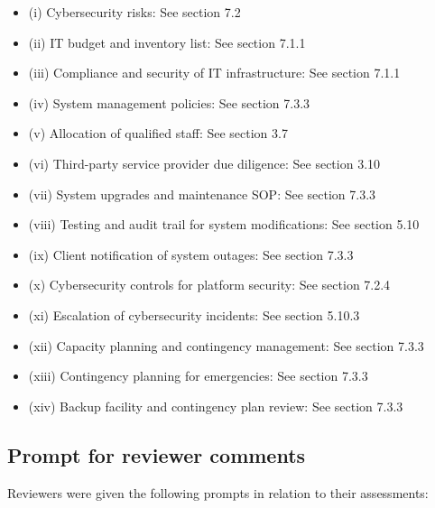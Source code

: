 \documentclass[]{report}
\begin{document}
\begin{itemize}
\begin{itemize}
\item (i) Cybersecurity risks: See section 7.2
\item (ii) IT budget and inventory list: See section 7.1.1
\item (iii) Compliance and security of IT infrastructure: See section 7.1.1
\item (iv) System management policies: See section 7.3.3
\item (v) Allocation of qualified staff: See section 3.7
\item (vi) Third-party service provider due diligence: See section 3.10
\item (vii) System upgrades and maintenance SOP: See section 7.3.3
\item (viii) Testing and audit trail for system modifications: See section 5.10
\item (ix) Client notification of system outages: See section 7.3.3
\item (x) Cybersecurity controls for platform security: See section 7.2.4
\item (xi) Escalation of cybersecurity incidents: See section 5.10.3
\item (xii) Capacity planning and contingency management: See section 7.3.3
\item (xiii) Contingency planning for emergencies: See section 7.3.3
\item (xiv) Backup facility and contingency plan review: See section 7.3.3
\end{itemize}
\end{itemize}

\subsection{Prompt for reviewer comments}
Reviewers were given the following prompts in relation to their
assessments:
\end{document}
